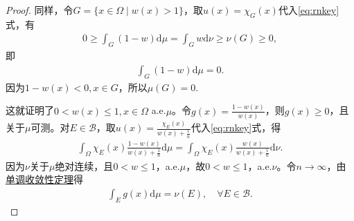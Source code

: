 \documentclass[../../main.tex]{subfiles}%
\begin{document}
\begin{proof}
同样，令$G=\{x\in\Omega\mid w(x)>1\}$，取$u(x)=\chi_G(x)$代入\eqref{eq:rnkey}式，有
\begin{align*}
0\geqslant\int_G (1-w)\mathrm{d}\mu=\int_G w\mathrm{d}\nu\geqslant\nu(G)\geqslant 0,
\end{align*}
即
\begin{align*}
\int_G (1-w)\mathrm{d}\mu=0.
\end{align*}
因为$1-w(x)<0,x\in G$，所以$\mu(G)=0$.

这就证明了$0<w(x)\leqslant 1,x\in\Omega$ a.e.$\mu$。令$g(x)=\frac{1-w(x)}{w(x)}$，则$g(x)\geqslant 0$，且关于$\mu$可测。对$E\in\mathcal{B}$，取$u(x)=\frac{\chi_E(x)}{w(x)+\frac{1}{n}}$代入\eqref{eq:rnkey}式，得
\begin{align}\label{eq:HIOUWJOIO23804723847892378941}
\int_\Omega \chi_E(x)\frac{1-w(x)}{w(x)+\frac{1}{n}}\mathrm{d}\mu=\int_\Omega \chi_E(x)\frac{w(x)}{w(x)+\frac{1}{n}}\mathrm{d}\nu.
\end{align}
因为$\nu$关于$\mu$绝对连续，且$0<w\leqslant 1$，a.e.$\mu$，故$0<w\leqslant 1$，a.e.$\nu$。令$n\to\infty$，由\hyperref[Real-Analysis-theorem:Beppo Levi非负渐升列积分定理]{单调收敛性定理}得
\begin{align}\label{eqFJKUHIOW94023890}
\int_E g(x)\mathrm{d}\mu=\nu(E),\quad \forall E\in\mathcal{B}.
\end{align}


\end{proof}
\end{document}

